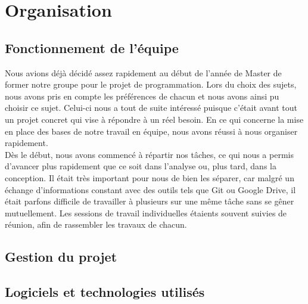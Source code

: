 \documentclass[16pts]{report}
\begin{document}

\nocite{*}

\chapter{Organisation}
\label{cha:Organisation}

\section{Fonctionnement de l'équipe}
\label{sec:Fonctionnement de l'équipe}

Nous avions déjà décidé assez rapidement au début de l'année de Master de former notre groupe pour le projet de programmation. Lors du choix des sujets, nous avons pris en compte les préférences de chacun et nous avons ainsi pu choisir ce sujet. Celui-ci nous a tout de suite intéressé puisque c'était avant tout un projet concret qui vise à répondre à un réel besoin.
En ce qui concerne la mise en place des bases de notre travail en équipe, nous avons réussi à nous organiser rapidement. 
\\
Dès le début, nous avons commencé à répartir nos tâches, ce qui nous a permis d’avancer plus rapidement que ce soit dans l’analyse ou, plus tard, dans la conception. Il était très important pour nous de bien les séparer, car malgré un échange d’informations constant avec des outils tels que Git ou Google Drive, il était parfons difficile de travailler à plusieurs sur une même tâche sans se gêner mutuellement. Les sessions de travail individuelles étaients souvent suivies de réunion, afin de rassembler les travaux de chacun.
\\


\section{Gestion du projet}
\label{sec:Gestion du projet}



\section{Logiciels et technologies utilisés}
\label{sec:Logiciels et technologies utilisés}
\end{document}
